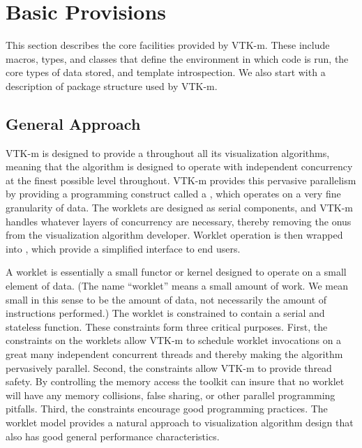 
\chapter{Basic Provisions}
\label{chap:BasicProvisions}

This section describes the core facilities provided by VTK-m. These include
macros, types, and classes that define the environment in which code is
run, the core types of data stored, and template introspection. We also
start with a description of package structure used by VTK-m.


\section{General Approach}
\label{sec:GeneralApproach}

VTK-m is designed to provide a 
 throughout all its visualization algorithms,
meaning that the algorithm is designed to operate with independent
concurrency at the finest possible level throughout. VTK-m provides this
pervasive parallelism by providing a programming construct called a
,  which operates on a very fine
granularity of data. The worklets are designed as serial components, and
VTK-m handles whatever layers of concurrency are necessary, thereby
removing the onus from the visualization algorithm developer. Worklet
operation is then wrapped into ,  which
provide a simplified interface to end users.

A worklet is essentially a small functor  or kernel
 designed to operate on a small element of data. (The name
``worklet'' means a small amount of work. We mean small in this sense to be
the amount of data, not necessarily the amount of instructions performed.)
The worklet is constrained to contain a serial and stateless function.
These constraints form three critical purposes. First, the constraints on
the worklets allow VTK-m to schedule worklet invocations on a great many
independent concurrent threads and thereby making the algorithm pervasively
parallel. Second, the constraints allow VTK-m to provide thread safety. By
controlling the memory access the toolkit can insure that no worklet will
have any memory collisions, false sharing, or other parallel programming
pitfalls. Third, the constraints encourage good programming practices. The
worklet model provides a natural approach to visualization algorithm design
that also has good general performance characteristics.

